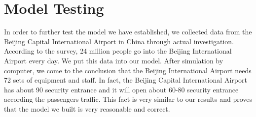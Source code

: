 \section{Model Testing}
In order to further test the model we have established, we collected data from the Beijing Capital International Airport in China through actual investigation. According to the survey, 24 million people go into the Beijing International Airport every day. We put this data into our model. After simulation by computer, we come to the conclusion that the Beijing International Airport needs 72 sets of equipment and staff. In fact, the Beijing Capital International Airport has about 90 security entrance and it will open about 60-80 security entrance according the passengers traffic. This fact is very similar to our results and proves that the model we built is very reasonable and correct.